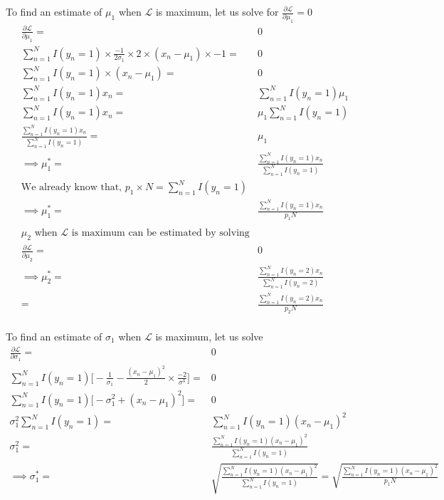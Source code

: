 \documentclass[letterpaper,doc,notimes]{apa6}
\begin{document}
{To find an estimate of $\mu_1$ when $\mathcal{L}$ is maximum, let us solve for $\frac{\partial \mathcal{L} }{\partial \mu_1} = 0$
\begin{align*}
\frac{\partial \mathcal{L} }{\partial \mu_1} =& 0 \\
	\sum_{n=1}^{N} I(y_n=1) \times \frac{-1}{2\sigma_1} \times 2 \times (x_n - \mu_1) \times -1 =& 0 \\
	\sum_{n=1}^{N} I(y_n=1) \times (x_n - \mu_1) =& 0 \\
		\sum_{n=1}^{N} I(y_n=1) x_n =&  \sum_{n=1}^{N} I(y_n=1) \mu_1 \\
				\sum_{n=1}^{N} I(y_n=1) x_n =& \mu_1 \sum_{n=1}^{N} I(y_n=1) \\
				\frac{ \sum_{n=1}^{N} I(y_n=1) x_n } {\sum_{n=1}^{N} I(y_n=1)}=& \mu_1  \\
				\implies \mu_1^* = & \frac{ \sum_{n=1}^{N} I(y_n=1) x_n } {\sum_{n=1}^{N} I(y_n=1)}  \\
		\text{We already know that, }  p_1 \times N = \sum_{n=1}^{N} I(y_n=1) & \\
	 \implies \mu_1^* = & \frac{ \sum_{n=1}^{N} I(y_n=1) x_n } {p_1 N} \\
	 \\
 \text{$\mu_2$ when $\mathcal{L}$ is maximum can be estimated by solving} & \\ \frac{\partial \mathcal{L} }{\partial \mu_2} = &0 \\
	 \implies \mu_2^* = & \frac{ \sum_{n=1}^{N} I(y_n=2) x_n } {\sum_{n=1}^{N} I(y_n=2)}  \\
	 	  = & \frac{ \sum_{n=1}^{N} I(y_n=2) x_n } {p_2 N} \\
\end{align*}

To find an estimate of $\sigma_1$ when $\mathcal{L}$ is maximum, let us solve
\begin{align*}
	\frac{\partial \mathcal{L} }{\partial \sigma_1} = &0  \\
	\sum_{n=1}^{N} I(y_n=1) \big[ -\frac{1}{\sigma_1} -\frac{(x_n - \mu_1)^2}{2} \times \frac{-2}{\sigma^3} \big] =& 0 \\
	\sum_{n=1}^{N} I(y_n=1) \big[ -\sigma_1^2 + (x_n - \mu_1)^2 \big] =& 0 \\
	\sigma_1^2 \sum_{n=1}^{N} I(y_n=1) =& \sum_{n=1}^{N} I(y_n=1) (x_n - \mu_1)^2 \\
    \sigma_1^2 =& \frac{ \sum_{n=1}^{N} I(y_n=1) (x_n - \mu_1)^2 }{\sum_{n=1}^{N} I(y_n=1)}\\
  \implies \sigma_1^* =& \sqrt{ \frac{ \sum_{n=1}^{N} I(y_n=1) (x_n - \mu_1)^2 }{\sum_{n=1}^{N} I(y_n=1)} } = \sqrt{ \frac{ \sum_{n=1}^{N} I(y_n=1) (x_n - \mu_1)^2 }{p_1 N} } \\
\end{align*}

}
\end{document}
